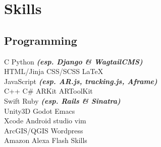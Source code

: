 \documentclass[a4paper]{deedy-resume} %
\begin{document}
\begin{minipage}[t]{0.33\textwidth}
\sectionspace %


\section{Skills}

\subsection{Programming}

\textbullet{} C \textbullet{} Python {\footnotesize \textit{\textbf{(esp. Django \& WagtailCMS)}}} \\
\textbullet{} HTML/Jinja \textbullet{} CSS/SCSS \textbullet{} \LaTeX\ \\
\textbullet{} JavaScript {\footnotesize \textit{\textbf{(esp. AR.js, tracking.js, Aframe)}}} \\
\sectionspace
{}
\textbullet{} C++ \textbullet{} C\# \textbullet{} ARKit \textbullet{} ARToolKit \\
\textbullet{} Swift \textbullet{} Ruby {\footnotesize \textit{\textbf{(esp. Rails \& Sinatra)}}} \\
\sectionspace
{}
\textbullet{} Unity3D \textbullet{} Godot \textbullet{} Emacs \\
\textbullet{} Xcode \textbullet{} Android studio \textbullet{} vim \\
\textbullet{} ArcGIS/QGIS \textbullet{} Wordpress \\
\textbullet{} Amazon Alexa Flash Skills\\

\sectionspace %



\end{minipage}
\end{document}
